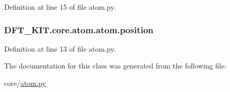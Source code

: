 Definition at line 15 of file atom.\+py.

\hypertarget{class_d_f_t___k_i_t_1_1core_1_1atom_1_1atom_aef47619bab2c82e9ed3b3c4faefde38b}{
\subsubsection[{position}]{\setlength{\rightskip}{0pt plus 5cm}D\+F\+T\+\_\+\+K\+I\+T.\+core.\+atom.\+atom.\+position}}\label{class_d_f_t___k_i_t_1_1core_1_1atom_1_1atom_aef47619bab2c82e9ed3b3c4faefde38b}


Definition at line 13 of file atom.\+py.



The documentation for this class was generated from the following file\+:\begin{DoxyCompactItemize}
\item 
core/\hyperlink{atom_8py}{atom.\+py}\end{DoxyCompactItemize}
